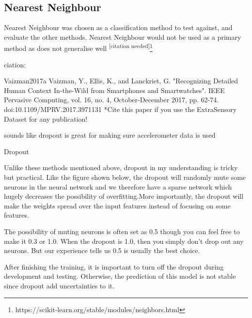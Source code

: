 \documentclass{UoNMCHA}
\newcommand{\citationneeded}{\textsuperscript{\color{blue} [citation needed]}}
\numberwithin{equation}{section}
\begin{document}
\subsection{Nearest Neighbour}
Nearest Neighbour was chosen as a classification method to test against, and evaluate the other methods. Nearest Neighbour would not be used as a primary method as does not generalise well\citationneeded \footnote{https://scikit-learn.org/stable/modules/neighbors.html}



ciation:

Vaizman2017a	
Vaizman, Y., Ellis, K., and Lanckriet, G. "Recognizing Detailed Human Context In-the-Wild from Smartphones and Smartwatches". IEEE Pervasive Computing, vol. 16, no. 4, October-December 2017, pp. 62-74. doi:10.1109/MPRV.2017.3971131
*Cite this paper if you use the ExtraSensory Dataset for any publication!




sounds like dropout is great for making sure accelerometer data is used

Dropout

Unlike these methods mentioned above, dropout in my understanding is tricky but practical. Like the figure shown below, the dropout will randomly mute some neurons in the neural network and we therefore have a sparse network which hugely decreases the possibility of overfitting.More importantly, the dropout will make the weights spread over the input features instead of focusing on some features.

The possibility of muting neurons is often set as 0.5 though you can feel free to make it 0.3 or 1.0. When the dropout is 1.0, then you simply don't drop out any neurons. But our experience tells us 0.5 is usually the best choice.

After finishing the training, it is important to turn off the dropout during development and testing. Otherwise, the prediction of this model is not stable since dropout add uncertainties to it.


\newpage
\end{document}
